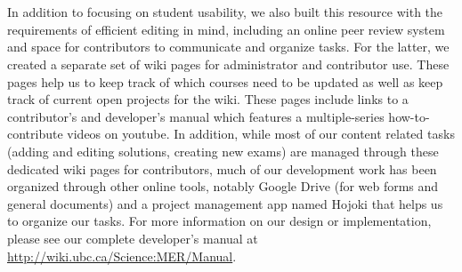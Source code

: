 \documentclass{primus}
\begin{document}
\\\\  
\noindent{}In addition to focusing on student usability, we also built this resource with the requirements of efficient editing in mind, including an online peer review system and space for contributors to communicate and organize tasks.  For the latter, we created a separate set of wiki pages for administrator and contributor use.  These pages help us to keep track of which courses need to be updated as well as keep track of current open projects for the wiki. These pages include links to a contributor’s and developer’s manual which features a multiple-series how-to-contribute videos on youtube.  In addition, while most of our content related tasks (adding and editing solutions, creating new exams) are managed through these dedicated wiki pages for contributors, much of our development work has been organized through other online tools, notably Google Drive (for web forms and general documents) and a project management app named Hojoki that helps us to organize our tasks.  For more information on our design or implementation, please see our complete developer’s manual at \url{http://wiki.ubc.ca/Science:MER/Manual}.
\end{document}
